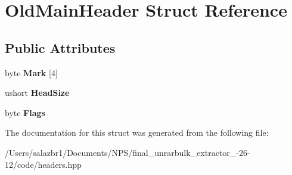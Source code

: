\hypertarget{struct_old_main_header}{\section{Old\-Main\-Header Struct Reference}
\label{struct_old_main_header}
}
\subsection*{Public Attributes}
\begin{DoxyCompactItemize}
\item 
\hypertarget{struct_old_main_header_a46c68916cfde9a3a4edb0f5cfb005ed3}{byte {\bfseries Mark} \mbox{[}4\mbox{]}}\label{struct_old_main_header_a46c68916cfde9a3a4edb0f5cfb005ed3}

\item 
\hypertarget{struct_old_main_header_a292e53b3eaf681ece34767b683515ab9}{ushort {\bfseries Head\-Size}}\label{struct_old_main_header_a292e53b3eaf681ece34767b683515ab9}

\item 
\hypertarget{struct_old_main_header_a24f364ad492dc28c43e58e4d55d8978c}{byte {\bfseries Flags}}\label{struct_old_main_header_a24f364ad492dc28c43e58e4d55d8978c}

\end{DoxyCompactItemize}


The documentation for this struct was generated from the following file\-:\begin{DoxyCompactItemize}
\item 
/\-Users/salazbr1/\-Documents/\-N\-P\-S/final\-\_\-unrarbulk\-\_\-extractor\-\_-\/26-\/12/code/headers.\-hpp\end{DoxyCompactItemize}
